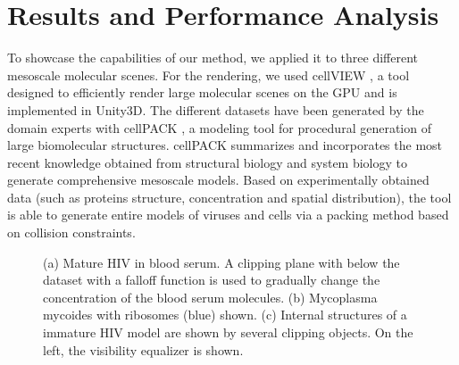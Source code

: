 \section{Results and Performance Analysis}

To showcase the capabilities of our method, we applied it to three different mesoscale molecular scenes. 
For the rendering, we used cellVIEW \cite{muzic15}, a tool designed to efficiently render large molecular scenes on the GPU and is implemented in Unity3D. 
The different datasets have been generated by the domain experts with cellPACK \cite{cellpack}, a modeling tool for procedural generation of large biomolecular structures.
cellPACK summarizes and incorporates the most recent knowledge obtained from structural biology and system biology to generate comprehensive mesoscale models. 
Based on experimentally obtained data (such as proteins structure, concentration and spatial distribution), the tool is able to generate entire models of viruses and cells via a packing method based on collision constraints.


\begin{figure}[t]
\centering
{}
\caption{\label{fig:res:res}
(a) Mature HIV in blood serum. A clipping plane with below the dataset with a falloff function is used to gradually change the concentration of the blood serum molecules.
(b) Mycoplasma mycoides with ribosomes (blue) shown. 
(c) Internal structures of a immature HIV model are shown by several clipping objects. On the left, the visibility equalizer is shown.}
\vspace{-3mm}
\end{figure}

